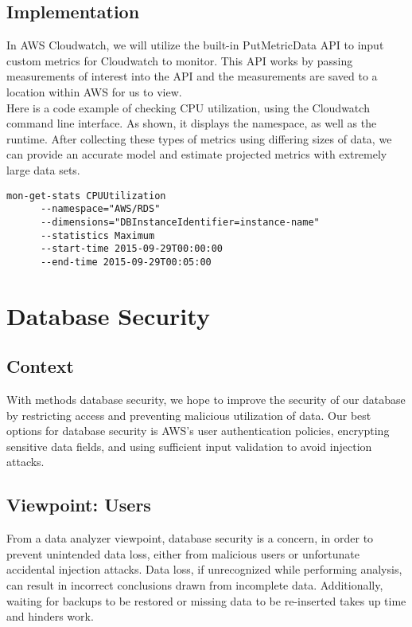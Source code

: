     \subsection{Implementation}
    In AWS Cloudwatch, we will utilize the built-in PutMetricData API to input custom metrics for Cloudwatch to monitor\cite{i1}. This API works by passing measurements of interest into the API and the measurements are saved to a location within AWS for us to view.\\
    
	\noindent Here is a code example of checking CPU utilization, using the Cloudwatch command line interface. As shown, it displays the namespace, as well as the runtime. After collecting these types of metrics using differing sizes of data, we can provide an accurate model and estimate projected metrics with extremely large data sets.

\begin{lstlisting}[caption=Cloudwatch monitoring example\cite{i2}]
mon-get-stats CPUUtilization   
      --namespace="AWS/RDS"     
      --dimensions="DBInstanceIdentifier=instance-name"
      --statistics Maximum
      --start-time 2015-09-29T00:00:00   
      --end-time 2015-09-29T00:05:00
\end{lstlisting}

\section{Database Security}
	\subsection{Context}
    With methods database security, we hope to improve the security of our database by restricting access and preventing malicious utilization of data. Our best options for database security is AWS’s user authentication policies, encrypting sensitive data fields, and using sufficient input validation to avoid injection attacks.
    \subsection{Viewpoint: Users}
    From a data analyzer viewpoint, database security is a concern, in order to prevent unintended data loss, either from malicious users or unfortunate accidental injection attacks. Data loss, if unrecognized while performing analysis, can result in incorrect conclusions drawn from incomplete data. Additionally, waiting for backups to be restored or missing data to be re-inserted takes up time and hinders work.
    
